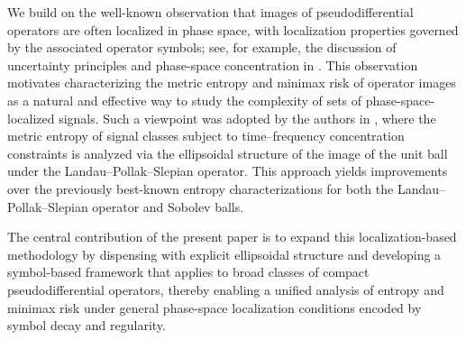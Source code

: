 \documentclass[a4paper,12pt]{article}
\begin{document}
We build on the well-known observation that images of pseudodifferential operators are often localized in phase space, with localization properties governed by the associated operator symbols; see, for example, the discussion of uncertainty principles and phase-space concentration in \cite{fefferman_uncertainty_1983}. This observation motivates characterizing the metric entropy and minimax risk of operator images as a natural and effective way to study the complexity of sets of phase-space-localized signals. Such a viewpoint was adopted by the authors in \cite[Section~3.1]{ab2025compactoperators}, where the metric entropy of signal classes subject to time–frequency concentration constraints is analyzed via the ellipsoidal structure of the image of the unit ball under the Landau–Pollak–Slepian operator. This approach yields improvements over the previously best-known entropy characterizations for both the Landau–Pollak–Slepian operator and Sobolev balls. 

The central contribution of the present paper is to expand this localization-based methodology by dispensing with explicit ellipsoidal structure and developing a symbol-based framework that applies to broad classes of compact pseudodifferential operators, thereby enabling a unified analysis of %
entropy and minimax risk under general phase-space localization conditions encoded by symbol decay and regularity.

\end{document}

